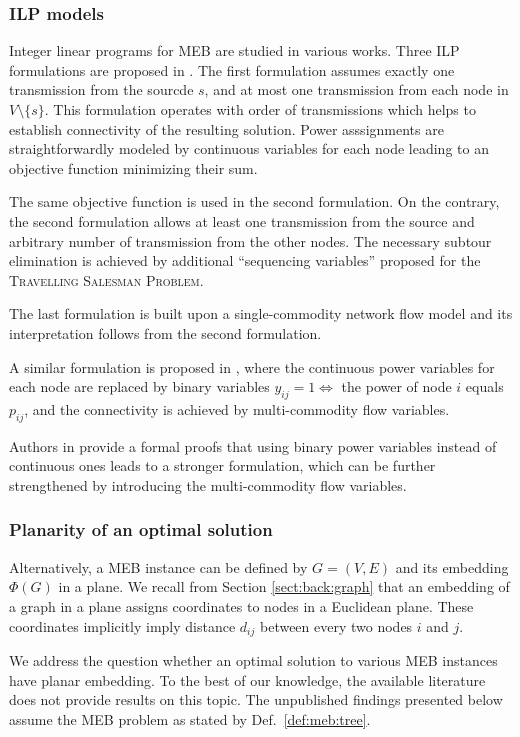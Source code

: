 \subsubsection{ILP models}

Integer linear programs for MEB are studied in various works.
Three ILP formulations are proposed in \cite{das03}.
The first formulation assumes exactly one transmission from the sourcde $s$, and at most one transmission from each node in $V\setminus\{s\}$.
This formulation operates with order of transmissions which helps to establish connectivity of the resulting solution.
Power asssignments are straightforwardly modeled by continuous variables for each node leading to an objective function minimizing their sum.

The same objective function is used in the second formulation.
On the contrary, the second formulation allows at least one transmission from the source and arbitrary number of transmission from the other nodes.
The necessary subtour elimination is achieved by additional ``sequencing variables'' proposed for the \textsc{Travelling Salesman Problem}.

The last formulation is built upon a single-commodity network flow model and its interpretation follows from the second formulation.

A similar formulation is proposed in \cite{yuan05}, where the continuous power variables for each node are replaced by binary variables $y_{ij}=1\Leftrightarrow$ the power of node $i$ equals $p_{ij}$,
and the connectivity is achieved by multi-commodity flow variables.

Authors in \cite{haugland11} provide a formal proofs that using binary power variables instead of continuous ones leads to a stronger formulation,
which can be further strengthened by introducing the multi-commodity flow variables.

\subsubsection{Planarity of an optimal solution}

Alternatively, a MEB instance can be defined by $G=(V,E)$ and its embedding $\Phi(G)$ in a plane.
We recall from Section \ref{sect:back:graph} that an embedding of a graph in a plane assigns coordinates to nodes in a Euclidean plane.
These coordinates implicitly imply distance $d_{ij}$ between every two nodes $i$ and $j$.

We address the question whether an optimal solution to various MEB instances have planar embedding.
To the best of our knowledge, the available literature does not provide results on this topic.
The unpublished findings presented below assume the MEB problem as stated by Def.~\ref{def:meb:tree}.

